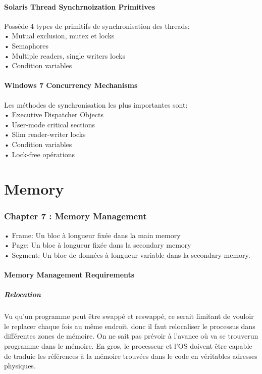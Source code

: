 \subsection{Solaris Thread Synchrnoization Primitives}
Possède 4 types de primitifs de synchronisation des threads: \\
• Mutual exclusion, mutex et locks\\
• Semaphores\\
• Multiple readers, single writers locks\\
• Condition variables\\
\subsection{Windows 7 Concurrency Mechanisms}
Les méthodes de synchronisation les plus importantes sont: \\
• Executive Dispatcher Objects \\
• User-mode critical sections \\
• Slim reader-writer locks\\
• Condition variables \\
• Lock-free opérations

\newpage
\part{Memory}


\section{Chapter 7 : Memory Management}
• Frame: Un bloc à longueur fixée dans la main memory \\
• Page: Un bloc à longueur fixée dans la secondary memory \\
• Segment: Un bloc de données à longueur variable dans la secondary memory. \\
\subsection{Memory Management Requirements}
\subsubsection{Relocation}
Vu qu'un programme peut être swappé et reswappé, ce serait limitant de vouloir le replacer chaque fois au même endroit, donc il faut relocaliser le processus dans différentes zones de mémoire. On ne sait pas prévoir à l'avance où va se trouverun programme dans le mémoire. En gros, le processeur et l'OS doivent être capable de traduie les références à la mémoire trouvées dans le code en véritables adresses physiques.
